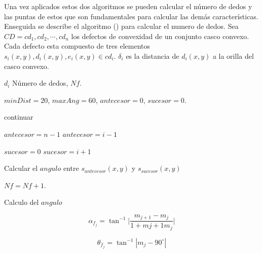 Una vez aplicados estos dos algoritmos se pueden calcular el número de dedos y las puntas de estos que son fundamentales para calcular las demás características. Enseguida se describe el algoritmo () para calcular el numero de dedos. 
Sea $CD={cd_1, cd_2, \cdots, cd_n}$ los defectos de convexidad de un conjunto casco convexo. Cada defecto esta compuesto de tres elementos $s_i(x,y),d_i(x,y),e_i(x,y) \in cd_i$. $\delta_i$ es la distancia de $d_i(x,y)$ a la orilla del casco convexo.  

\begin{algorithm}
\begin{algorithmic}[1]

\REQUIRE $d_i$
\ENSURE Número de dedos, $Nf$.  

	\STATE $minDist=20$, $maxAng=60$, $antecesor=0$, $sucesor=0$. 	
	
	\STATE continuar
	\ENDIF 
	
	\STATE $antecesor=n-1$
	\ELSE
	\STATE $antecesor=i-1$
	\ENDIF 

	\STATE $sucesor=0$
	\ELSE
	\STATE $sucesor=i+1$
	\ENDIF   
	
	\STATE Calcular el $angulo$ entre $s_{antecesor}(x,y)$ y $s_{sucesor}(x,y)$
	
	\RETURN \FALSE
	\ENDIF  
	
	\STATE $Nf=Nf+1$.

\ENDFOR 

\end{algorithmic}
\end{algorithm}


Calculo del $angulo$

$$ \alpha_{f_j} = \tan^{-1}{ \bigg| \frac{m_{j+1}-m_j}{1+m{j+1}m_j} \bigg|}$$

$$ \theta_{f_j} = \tan^{-1} | {m_j} - 90^\circ |$$


 

%


